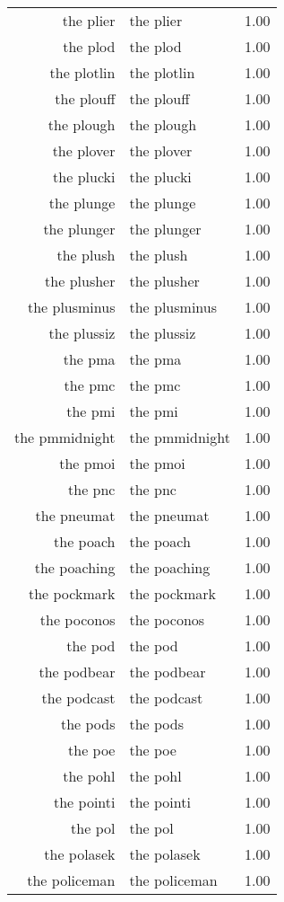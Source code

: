 \begin{table}[ht]
\begin{tabular}{rlr}
  the plier & the plier & 1.00 \\ 
  the plod & the plod & 1.00 \\ 
  the plotlin & the plotlin & 1.00 \\ 
  the plouff & the plouff & 1.00 \\ 
  the plough & the plough & 1.00 \\ 
  the plover & the plover & 1.00 \\ 
  the plucki & the plucki & 1.00 \\ 
  the plunge & the plunge & 1.00 \\ 
  the plunger & the plunger & 1.00 \\ 
  the plush & the plush & 1.00 \\ 
  the plusher & the plusher & 1.00 \\ 
  the plusminus & the plusminus & 1.00 \\ 
  the plussiz & the plussiz & 1.00 \\ 
  the pma & the pma & 1.00 \\ 
  the pmc & the pmc & 1.00 \\ 
  the pmi & the pmi & 1.00 \\ 
  the pmmidnight & the pmmidnight & 1.00 \\ 
  the pmoi & the pmoi & 1.00 \\ 
  the pnc & the pnc & 1.00 \\ 
  the pneumat & the pneumat & 1.00 \\ 
  the poach & the poach & 1.00 \\ 
  the poaching & the poaching & 1.00 \\ 
  the pockmark & the pockmark & 1.00 \\ 
  the poconos & the poconos & 1.00 \\ 
  the pod & the pod & 1.00 \\ 
  the podbear & the podbear & 1.00 \\ 
  the podcast & the podcast & 1.00 \\ 
  the pods & the pods & 1.00 \\ 
  the poe & the poe & 1.00 \\ 
  the pohl & the pohl & 1.00 \\ 
  the pointi & the pointi & 1.00 \\ 
  the pol & the pol & 1.00 \\ 
  the polasek & the polasek & 1.00 \\ 
  the policeman & the policeman & 1.00 \\ 

\end{tabular}
\end{table}
